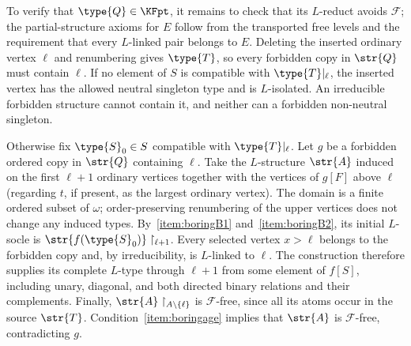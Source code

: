To verify that $\type{Q}\in\KFpt$, it remains to check that
		its $L$-reduct avoids $\mathcal F$; the partial-structure axioms
		for $E$ follow from the transported free levels and the requirement
		that every $L$-linked pair belongs to $E$.
		Deleting the inserted ordinary vertex $\ell$ and renumbering gives
		$\type{T}$, so every forbidden copy in $\str{Q}$ must contain $\ell$.
		If no element of $S$ is compatible with $\type{T}|_\ell$, the inserted
		vertex has the allowed neutral singleton type and is $L$-isolated.
		An irreducible forbidden structure cannot contain it, and neither
		can a forbidden non-neutral singleton.

		Otherwise fix $\type{S}_0\in S$ compatible with
		$\type{T}|_\ell$. Let $g$ be a forbidden ordered copy in $\str{Q}$
		containing $\ell$. Take the $L$-structure $\str{A}$ induced on
		the first $\ell+1$ ordinary vertices together with the vertices
		of $g[F]$ above $\ell$ (regarding $t$, if present, as the largest
		ordinary vertex). The domain is a finite ordered subset of $\omega$;
		order-preserving renumbering of the upper vertices does not change
		any induced types.
		By~\ref{item:boringB1} and~\ref{item:boringB2}, its initial
		$L$-socle is
		$\str{f(\type{S}_0)}\restriction_{\ell+1}$.
		Every selected vertex $x>\ell$ belongs to the forbidden copy and,
		by irreducibility, is $L$-linked to $\ell$.
		The construction therefore supplies its complete $L$-type
		through $\ell+1$ from some element of $f[S]$,
		including unary, diagonal, and both directed binary relations
		and their complements.
		Finally, $\str{A}\restriction_{A\setminus\{\ell\}}$ is
		$\mathcal F$-free, since all its atoms occur in the source
		$\str{T}$. Condition~\ref{item:boringage} implies that
		$\str{A}$ is $\mathcal F$-free, contradicting $g$.
